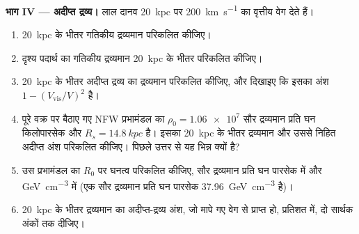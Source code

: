 \begin{problem}
\medskip\noindent\textbf{भाग IV --- अदीप्त द्रव्य।} लाल दानव
\qty{20}{kpc} पर \qty{200}{km.s^{-1}} का वृत्तीय वेग देते हैं।
\begin{enumerate}[resume]
\item \qty{20}{kpc} के भीतर गतिकीय द्रव्यमान परिकलित कीजिए।
\item दृश्य पदार्थ का गतिकीय द्रव्यमान
  \qty{20}{kpc} के भीतर परिकलित कीजिए।
\item \qty{20}{kpc} के भीतर अदीप्त द्रव्य का द्रव्यमान परिकलित कीजिए, और दिखाइए कि
  इसका अंश $1 - (V_\mathrm{vis}/V)^2$ है।
\item पूरे वक्र पर बैठाए गए NFW प्रभामंडल का
  $\rho_0 = \num{1.06e7}$ सौर द्रव्यमान प्रति घन किलोपारसेक और
  $R_s = \qty{14.8}{kpc}$ है। इसका \qty{20}{kpc} के भीतर द्रव्यमान और उससे
  निहित अदीप्त अंश परिकलित कीजिए। पिछले उत्तर से यह भिन्न क्यों है?
\item उस प्रभामंडल का $R_0$ पर घनत्व परिकलित कीजिए, सौर द्रव्यमान प्रति
  घन पारसेक में और \unit{GeV.cm^{-3}} में (एक सौर द्रव्यमान प्रति घन पारसेक
  \qty{37.96}{GeV.cm^{-3}} है)।
\item \qty{20}{kpc} के भीतर द्रव्यमान का अदीप्त-द्रव्य अंश, जो मापे गए वेग से
  प्राप्त हो, प्रतिशत में, दो
  सार्थक अंकों तक दीजिए।
\end{enumerate}
\end{problem}
